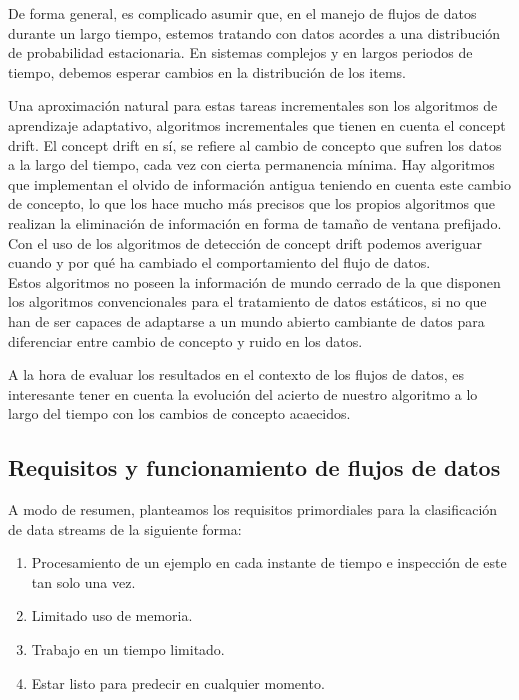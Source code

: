 De forma general, es complicado asumir que, en el manejo de flujos de datos durante un largo tiempo, estemos tratando con datos acordes a una distribución de probabilidad
estacionaria. En sistemas complejos y en largos periodos de tiempo, debemos esperar cambios en la distribución de los items.

Una aproximación natural para estas tareas incrementales son los algoritmos de aprendizaje adaptativo, algoritmos incrementales que tienen en cuenta el concept drift.
El concept drift en sí, se refiere al cambio de concepto que sufren los datos a la largo del tiempo, cada vez con cierta permanencia mínima.
Hay algoritmos que implementan el olvido de información antigua teniendo en cuenta este cambio de concepto, lo que los hace mucho más precisos que los propios algoritmos
que realizan la eliminación de información en forma de tamaño de ventana prefijado.\\
Con el uso de los algoritmos de detección de concept drift podemos averiguar cuando y por qué ha cambiado el comportamiento del flujo de datos.\\
Estos algoritmos no poseen la información de mundo cerrado de la que disponen los algoritmos convencionales para el tratamiento de datos estáticos, si no que han de ser
capaces de adaptarse a un mundo abierto cambiante de datos para diferenciar entre cambio de concepto y ruido en los datos.

A la hora de evaluar los resultados en el contexto de los flujos de datos, es interesante tener en cuenta la evolución del acierto de nuestro algoritmo a lo largo del tiempo
con los cambios de concepto acaecidos.



\subsection{Requisitos y funcionamiento de flujos de datos}

A modo de resumen, planteamos los requisitos primordiales para la clasificación de data streams de la siguiente forma:
\begin{enumerate}
	\item Procesamiento de un ejemplo en cada instante de tiempo e inspección de este tan solo una vez.
	\item Limitado uso de memoria.
	\item Trabajo en un tiempo limitado.
	\item Estar listo para predecir en cualquier momento.
\end{enumerate}

